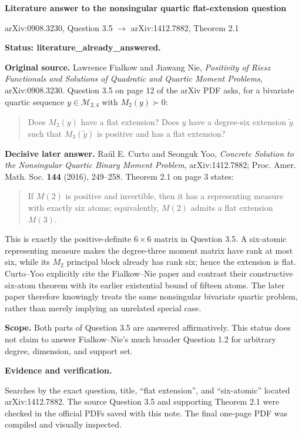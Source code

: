 \documentclass[10pt]{article}
\begin{document}
\begin{center}
{\Large\bfseries Literature answer to the nonsingular quartic flat-extension question}\par
\medskip
{\small arXiv:0908.3230, Question 3.5 $\longrightarrow$ arXiv:1412.7882, Theorem 2.1}
\end{center}

\textbf{Status: literature\_already\_answered.}

\textbf{Original source.} Lawrence Fialkow and Jiawang Nie,
\emph{Positivity of Riesz Functionals and Solutions of Quadratic and Quartic Moment Problems}, arXiv:0908.3230.  Question 3.5 on page 12 of the arXiv PDF asks, for a bivariate quartic sequence $y\in\mathcal M_{2,4}$ with $M_2(y)\succ0$:
\begin{quote}
Does $M_2(y)$ have a flat extension?  Does $y$ have a degree-six extension $\widetilde y$ such that $M_3(\widetilde y)$ is positive and has a flat extension?
\end{quote}

\textbf{Decisive later answer.} Ra\'ul E. Curto and Seonguk Yoo,
\emph{Concrete Solution to the Nonsingular Quartic Binary Moment Problem}, arXiv:1412.7882; Proc. Amer. Math. Soc. \textbf{144} (2016), 249--258.  Theorem 2.1 on page 3 states:
\begin{quote}
If $M(2)$ is positive and invertible, then it has a representing measure with exactly six atoms; equivalently, $M(2)$ admits a flat extension $M(3)$.
\end{quote}

This is exactly the positive-definite $6\times6$ matrix in Question 3.5.  A six-atomic representing measure makes the degree-three moment matrix have rank at most six, while its $M_2$ principal block already has rank six; hence the extension is flat.  Curto--Yoo explicitly cite the Fialkow--Nie paper and contrast their constructive six-atom theorem with its earlier existential bound of fifteen atoms.  The later paper therefore knowingly treats the same nonsingular bivariate quartic problem, rather than merely implying an unrelated special case.

\textbf{Scope.} Both parts of Question 3.5 are answered affirmatively.  This status does not claim to answer Fialkow--Nie's much broader Question 1.2 for arbitrary degree, dimension, and support set.

\textbf{Evidence and verification.}\par
Searches by the exact question, title, ``flat extension'', and ``six-atomic'' located arXiv:1412.7882.  The source Question 3.5 and supporting Theorem 2.1 were checked in the official PDFs saved with this note.  The final one-page PDF was compiled and visually inspected.
\end{document}
